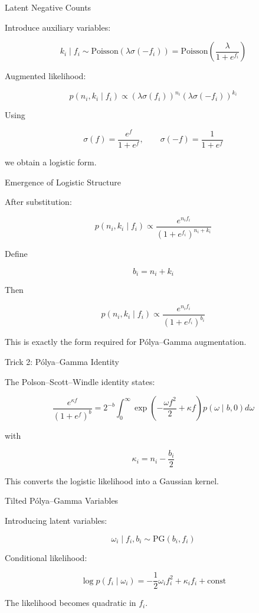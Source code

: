 \documentclass[11pt]{beamer}
\begin{document}
\begin{frame}{Latent Negative Counts}

Introduce auxiliary variables:

\[
k_i \mid f_i
\sim
\text{Poisson}(\lambda\sigma(-f_i))
=
\text{Poisson}\left(\frac{\lambda}{1+e^{f_i}}\right)
\]

Augmented likelihood:

\[
p(n_i,k_i \mid f_i)
\propto
(\lambda\sigma(f_i))^{n_i}
(\lambda\sigma(-f_i))^{k_i}
\]

Using

\[
\sigma(f)=\frac{e^f}{1+e^f},
\qquad
\sigma(-f)=\frac{1}{1+e^f}
\]

we obtain a logistic form.

\end{frame}

\begin{frame}{Emergence of Logistic Structure}

After substitution:

\[
p(n_i,k_i \mid f_i)
\propto
\frac{e^{n_i f_i}}{(1+e^{f_i})^{n_i+k_i}}
\]

Define

\[
b_i = n_i + k_i
\]

Then

\[
p(n_i,k_i \mid f_i)
\propto
\frac{e^{n_i f_i}}{(1+e^{f_i})^{b_i}}
\]

This is exactly the form required for
Pólya–Gamma augmentation.

\end{frame}

\begin{frame}{Trick 2: Pólya--Gamma Identity}

The Polson--Scott--Windle identity states:

\[
\frac{e^{\kappa f}}{(1+e^f)^b}
=
2^{-b}
\int_0^\infty
\exp\!\left(-\frac{\omega f^2}{2} + \kappa f\right)
p(\omega \mid b,0)
d\omega
\]

with

\[
\kappa_i = n_i - \frac{b_i}{2}
\]

This converts the logistic likelihood
into a Gaussian kernel.

\end{frame}

\begin{frame}{Tilted Pólya--Gamma Variables}

Introducing latent variables:

\[
\omega_i \mid f_i,b_i
\sim
\text{PG}(b_i,f_i)
\]

Conditional likelihood:

\[
\log p(f_i \mid \omega_i)
=
-\frac12 \omega_i f_i^2
+ 
\kappa_i f_i
+
\text{const}
\]

The likelihood becomes quadratic in $f_i$.

\end{frame}
\end{document}
